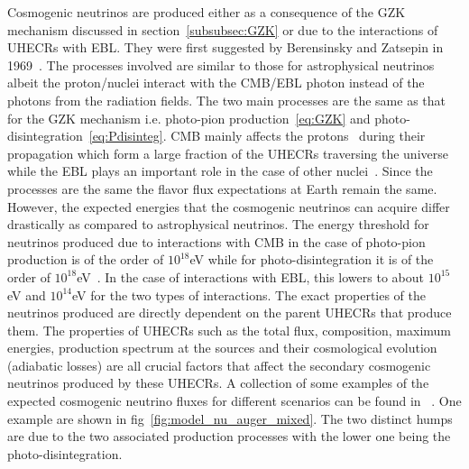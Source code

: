Cosmogenic neutrinos are produced either as a consequence of the \gls{GZK} mechanism discussed in section~\ref{subsubsec:GZK} or due to the interactions of \glspl{UHECR} with \gls{EBL}. They were first suggested by Berensinsky and Zatsepin in 1969~\cite{Berezinsky:1970xj}. The processes involved are similar to those for astrophysical neutrinos albeit the proton/nuclei interact with the CMB/EBL photon instead of the photons from the radiation fields. The two main processes are the same as that for the GZK mechanism i.e. photo-pion production~\ref{eq:GZK} and photo-disintegration~\ref{eq:Pdisinteg}. \gls{CMB} mainly affects the protons~\cite{Ehlert_2024} during their propagation which form a large fraction of the \glspl{UHECR} traversing the universe while the EBL plays an important role in the case of other nuclei~\cite{Aloisio_2015}. 
Since the processes are the same the flavor flux expectations at Earth remain the same. However, the expected energies that the cosmogenic neutrinos can acquire differ drastically as compared to astrophysical neutrinos. The energy threshold for neutrinos produced due to interactions with \gls*{CMB} in the case of photo-pion production is of the order of $10^{18}$eV while for photo-disintegration it is of the order of $10^{18}$eV~\cite{Aloisio_2015}. In the case of interactions with \gls*{EBL}, this lowers to about $10^{15}$eV and $10^{14}$eV for the two types of interactions. 
The exact properties of the neutrinos produced are directly dependent on the parent \glspl*{UHECR} that produce them. The properties of \glspl{UHECR} such as the total flux, composition, maximum energies, production spectrum at the sources and their cosmological evolution (adiabatic losses) are all crucial factors that affect the  secondary cosmogenic neutrinos produced by these \glspl*{UHECR}. A collection of some examples of the expected cosmogenic neutrino fluxes for different scenarios can be found in ~\cite{KAMPERT2012660,AlvesBatista:2018zui,Heinze:2019jou}. One example are shown in fig~\ref{fig:model_nu_auger_mixed}. The two distinct humps are due to the two associated production processes with the lower one being the photo-disintegration. 


